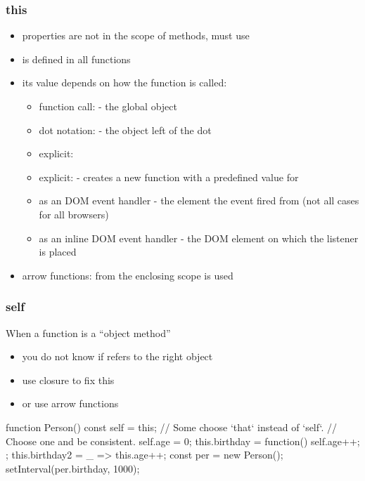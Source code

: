 \begin{frame}[fragile] \frametitle{this}
\begin{itemize}
  \item properties are not in the scope of methods, must use 
  \item {} is defined in all functions
  \item its value depends on how the function is called:
  \begin{itemize}
    \item function call:  - the global object
    \item dot notation:  - the object left of the dot
    \item explicit: 
    \item explicit:  - creates a new function with a predefined value for 
    \item as an DOM event handler - the element the event fired from (not all cases for all browsers)
    \item as an inline DOM event handler - the DOM element on which the listener is placed
  \end{itemize}
  \item arrow functions:  from the enclosing scope is used
\end{itemize}
\end{frame}

\begin{frame}[fragile] \frametitle{self}
When a function is a ``object method''
\begin{itemize}
  \item you do not know if  refers to the right object
  \item use closure to fix this
  \item or use arrow functions
\end{itemize}
\begin{CodeBox}{}
function Person() {
  const self = this; // Some choose `that` instead of `self`. 
                           // Choose one and be consistent.
  self.age = 0;
  this.birthday = function() { self.age++; };
  this.birthday2 = _ =>  this.age++;
}
const per = new Person();
setInterval(per.birthday, 1000);
\end{CodeBox}
\end{frame}

